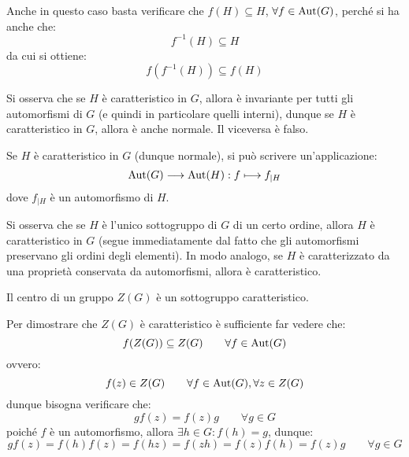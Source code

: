 \documentclass[11pt]{scrartcl}
\begin{document}
Anche in questo caso basta verificare che $f(H) \subseteq H$, $\forall f \in \operatorname{Aut}(G)$, perché si ha anche che:
    \[ f^{-1}(H) \subseteq H
        \]
da cui si ottiene:
    \[ f(f^{-1}(H)) \subseteq f(H)
        \]

\begin{remark}
    Si osserva che se $H$ è caratteristico in $G$, allora è invariante per tutti gli automorfismi di $G$ (e quindi in particolare quelli interni), dunque
    se $H$ è caratteristico in $G$, allora è anche normale. Il viceversa è falso.
\end{remark}

\begin{remark}
    Se $H$ è caratteristico in $G$ (dunque normale), si può scrivere un'applicazione:
        \[ \operatorname{Aut}(G) \longrightarrow \operatorname{Aut}(H) : f \longmapsto f_{\mid H}
            \]
    dove $f_{\mid H}$ è un automorfismo di $H$.
\end{remark}

\begin{remark}
    Si osserva che se $H$ è l'unico sottogruppo di $G$ di un certo ordine, allora $H$ è caratteristico in $G$ (segue immediatamente dal fatto che gli automorfismi
    preservano gli ordini degli elementi).
    In modo analogo, se $H$ è caratterizzato da una proprietà conservata da automorfismi, allora è caratteristico.
\end{remark}

\begin{exercise}
    Il centro di un gruppo $Z(G)$ è un sottogruppo caratteristico.
\end{exercise}
        
\begin{soln}
    Per dimostrare che $Z(G)$ è caratteristico è sufficiente far vedere che:
        \[ f(Z(G)) \subseteq Z(G)
        \qquad \forall f \in \operatorname{Aut}(G)
            \]
    ovvero:
        \[ f(z) \in Z(G)
        \qquad \forall f \in \operatorname{Aut}(G), \forall z \in Z(G)
            \]
    dunque bisogna verificare che:
        \[ gf(z) = f(z)g \qquad \forall g \in G
            \]
    poiché $f$ è un automorfismo, allora $\exists h \in G : f(h) = g$, dunque:
        \[ gf(z) = f(h)f(z) = f(hz) = f(zh) = f(z)f(h) = f(z)g \qquad \forall g \in G
            \]
\end{soln}
\end{document}
